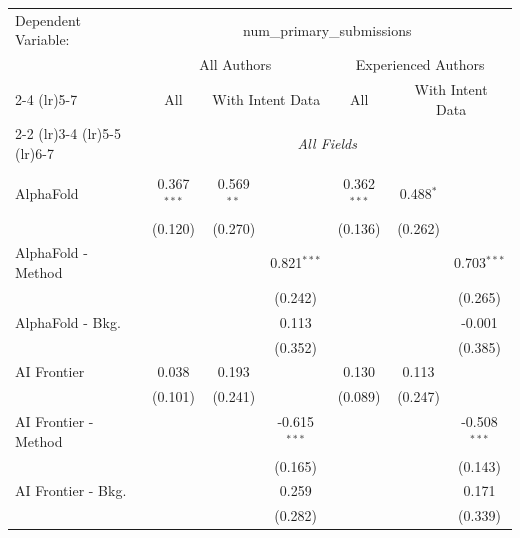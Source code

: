 \begingroup
\centering
\begin{tabular}{lcccccc}
   \tabularnewline \midrule \midrule
   Dependent Variable: & \multicolumn{6}{c}{num\_primary\_submissions}\\
 & \multicolumn{3}{c}{All Authors} & \multicolumn{3}{c}{Experienced Authors} \\
\cmidrule(lr){2-4} \cmidrule(lr){5-7}
 & \multicolumn{1}{c}{All} & \multicolumn{2}{c}{With Intent Data} & \multicolumn{1}{c}{All} & \multicolumn{2}{c}{With Intent Data} \\
\cmidrule(lr){2-2} \cmidrule(lr){3-4} \cmidrule(lr){5-5} \cmidrule(lr){6-7}
 & \multicolumn{6}{c}{\textit{All Fields}} \\ \\
   AlphaFold            & 0.367$^{***}$ & 0.569$^{**}$ &                & 0.362$^{***}$ & 0.488$^{*}$ &   \\   
                        & (0.120)       & (0.270)      &                & (0.136)       & (0.262)     &   \\   
   AlphaFold - Method   &               &              & 0.821$^{***}$  &               &             & 0.703$^{***}$\\   
                        &               &              & (0.242)        &               &             & (0.265)\\   
   AlphaFold - Bkg.     &               &              & 0.113          &               &             & -0.001\\   
                        &               &              & (0.352)        &               &             & (0.385)\\   
   AI Frontier          & 0.038         & 0.193        &                & 0.130         & 0.113       &   \\   
                        & (0.101)       & (0.241)      &                & (0.089)       & (0.247)     &   \\   
   AI Frontier - Method &               &              & -0.615$^{***}$ &               &             & -0.508$^{***}$\\   
                        &               &              & (0.165)        &               &             & (0.143)\\   
   AI Frontier - Bkg.   &               &              & 0.259          &               &             & 0.171\\   
                        &               &              & (0.282)        &               &             & (0.339)\\   

\end{tabular}
